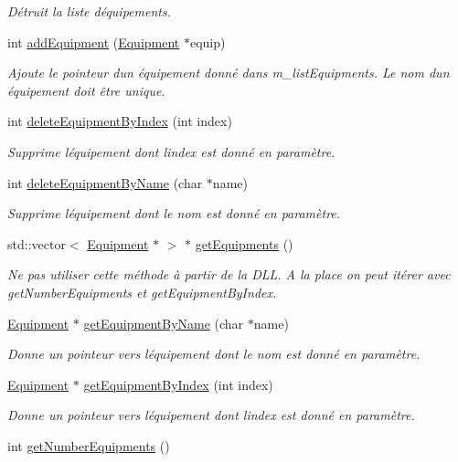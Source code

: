 \begin{DoxyCompactItemize}
\begin{DoxyCompactList}\small\item\em Détruit la liste d\textquotesingle{}équipements. \end{DoxyCompactList}\item 
int \hyperlink{class_e_p_1_1_room_a818eb638f5796bfc45a519ce503c30be}{add\+Equipment} (\hyperlink{class_e_p_1_1_equipment}{Equipment} $\ast$equip)
\begin{DoxyCompactList}\small\item\em Ajoute le pointeur d\textquotesingle{}un équipement donné dans m\+\_\+list\+Equipments. Le nom d\textquotesingle{}un équipement doit être unique. \end{DoxyCompactList}\item 
int \hyperlink{class_e_p_1_1_room_a9d9a93b373460edb886a05e8942aa589}{delete\+Equipment\+By\+Index} (int index)
\begin{DoxyCompactList}\small\item\em Supprime l\textquotesingle{}équipement dont l\textquotesingle{}index est donné en paramètre. \end{DoxyCompactList}\item 
int \hyperlink{class_e_p_1_1_room_a4879b1eeebccc1a3c2f5ece234f73da9}{delete\+Equipment\+By\+Name} (char $\ast$name)
\begin{DoxyCompactList}\small\item\em Supprime l\textquotesingle{}équipement dont le nom est donné en paramètre. \end{DoxyCompactList}\item 
std\+::vector$<$ \hyperlink{class_e_p_1_1_equipment}{Equipment} $\ast$ $>$ $\ast$ \hyperlink{class_e_p_1_1_room_ad4993f6208f136a9f1bd082def0d53c0}{get\+Equipments} ()
\begin{DoxyCompactList}\small\item\em Ne pas utiliser cette méthode à partir de la D\+LL. A la place on peut itérer avec get\+Number\+Equipments et get\+Equipment\+By\+Index. \end{DoxyCompactList}\item 
\hyperlink{class_e_p_1_1_equipment}{Equipment} $\ast$ \hyperlink{class_e_p_1_1_room_a7f7aeb553f256013f1f54c245e238dfd}{get\+Equipment\+By\+Name} (char $\ast$name)
\begin{DoxyCompactList}\small\item\em Donne un pointeur vers l\textquotesingle{}équipement dont le nom est donné en paramètre. \end{DoxyCompactList}\item 
\hyperlink{class_e_p_1_1_equipment}{Equipment} $\ast$ \hyperlink{class_e_p_1_1_room_a22185f0f9e75c03fe2fd61c958df3ead}{get\+Equipment\+By\+Index} (int index)
\begin{DoxyCompactList}\small\item\em Donne un pointeur vers l\textquotesingle{}équipement dont l\textquotesingle{}index est donné en paramètre. \end{DoxyCompactList}\item 
int \hyperlink{class_e_p_1_1_room_af66a08a85258e5da63a3684a9efc98ef}{get\+Number\+Equipments} ()
\end{DoxyCompactItemize}
